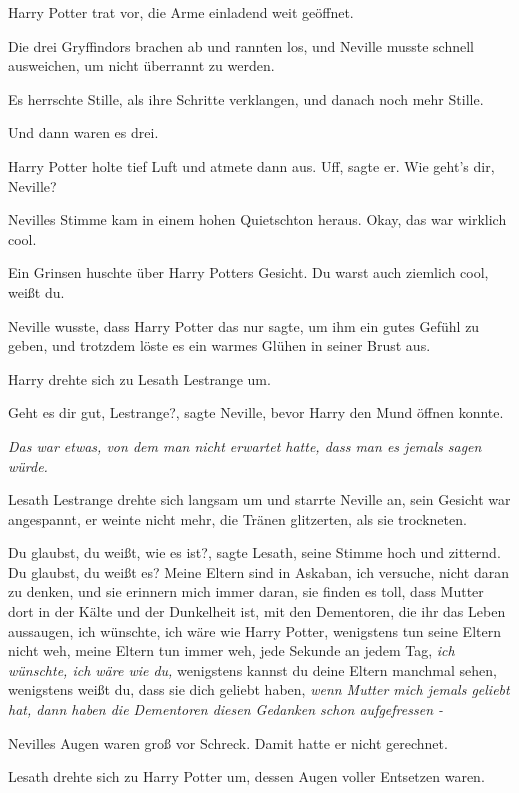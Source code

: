 Harry Potter trat vor, die Arme einladend weit geöffnet.

Die drei Gryffindors brachen ab und rannten los, und Neville musste schnell
ausweichen, um nicht überrannt zu werden.

Es herrschte Stille, als ihre Schritte verklangen, und danach noch mehr Stille.

Und dann waren es drei.

Harry Potter holte tief Luft und atmete dann aus. \glqq{}Uff\grqq{}, sagte er.
\glqq{}Wie geht's dir, Neville?\grqq{}

Nevilles Stimme kam in einem hohen Quietschton heraus. \glqq{}Okay, das war
wirklich cool.\grqq{}

Ein Grinsen huschte über Harry Potters Gesicht. \glqq{}Du warst auch ziemlich
cool, weißt du.\grqq{}

Neville wusste, dass Harry Potter das nur sagte, um ihm ein gutes Gefühl zu
geben, und trotzdem löste es ein warmes Glühen in seiner Brust aus.

Harry drehte sich zu Lesath Lestrange um.

\glqq{}Geht es dir gut, Lestrange?\grqq{}, sagte Neville, bevor Harry den Mund
öffnen konnte.

\emph{Das war etwas, von dem man nicht erwartet hatte, dass man es jemals sagen
würde.}

Lesath Lestrange drehte sich langsam um und starrte Neville an, sein Gesicht war
angespannt, er weinte nicht mehr, die Tränen glitzerten, als sie trockneten.

\glqq{}Du glaubst, du weißt, wie es ist?\grqq{}, sagte Lesath, seine Stimme hoch
und zitternd. \glqq{}Du glaubst, du weißt es? Meine Eltern sind in Askaban, ich
versuche, nicht daran zu denken, und sie erinnern mich immer daran, sie finden
es toll, dass Mutter dort in der Kälte und der Dunkelheit ist, mit den
Dementoren, die ihr das Leben aussaugen, ich wünschte, ich wäre wie Harry
Potter, wenigstens tun seine Eltern nicht weh, meine Eltern tun immer weh, jede
Sekunde an jedem Tag, \emph{ich wünschte, ich wäre wie du,} wenigstens kannst du
deine Eltern manchmal sehen, wenigstens weißt du, dass sie dich geliebt haben,
\emph{wenn Mutter mich jemals geliebt hat, dann haben die Dementoren diesen
Gedanken schon aufgefressen -\grqq{}}

Nevilles Augen waren groß vor Schreck. Damit hatte er nicht gerechnet.

Lesath drehte sich zu Harry Potter um, dessen Augen voller Entsetzen waren.

